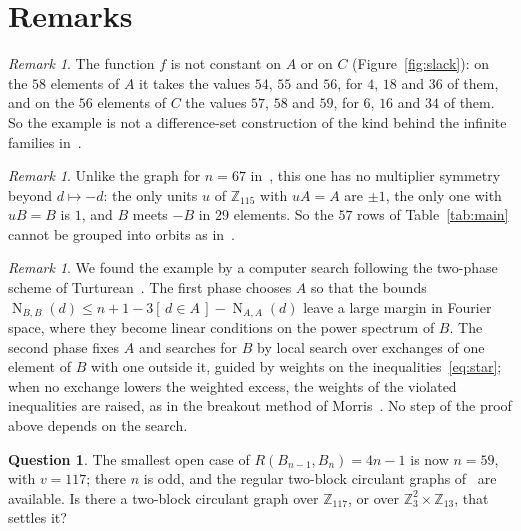 \documentclass[11pt]{amsart}
\theoremstyle{definition}
\newtheorem{question}[theorem]{Question}
\theoremstyle{remark}
\newtheorem{remark}[theorem]{Remark}
\numberwithin{equation}{section}
\newcommand{\Z}{\mathbb{Z}}
\newcommand{\NN}{\operatorname{N}}
\newcommand{\ind}[1]{[\,#1\,]}
\begin{document}
\section{Remarks}\label{sec:remarks}

\begin{remark}
The function $f$ is not constant on $A$ or on $C$ (Figure~\ref{fig:slack}): on the $58$ elements of $A$ it takes the values $54$, $55$ and $56$, for $4$, $18$ and $36$ of them, and on the $56$ elements of $C$ the values $57$, $58$ and $59$, for $6$, $16$ and $34$ of them. So the example is not a difference-set construction of the kind behind the infinite families in~\cite{Sz,Tu,We}.
\end{remark}

\begin{remark}
Unlike the graph for $n=67$ in~\cite{Bh}, this one has no multiplier symmetry beyond $d\mapsto-d$: the only units $u$ of $\Z_{115}$ with $uA=A$ are $\pm1$, the only one with $uB=B$ is $1$, and $B$ meets $-B$ in $29$ elements. So the $57$ rows of Table~\ref{tab:main} cannot be grouped into orbits as in~\cite{Bh}.
\end{remark}

\begin{remark}
We found the example by a computer search following the two-phase scheme of Turturean~\cite{Tu}. The first phase chooses $A$ so that the bounds $\NN_{B,B}(d)\le n+1-3\ind{d\in A}-\NN_{A,A}(d)$ leave a large margin in Fourier space, where they become linear conditions on the power spectrum of $B$. The second phase fixes $A$ and searches for $B$ by local search over exchanges of one element of $B$ with one outside it, guided by weights on the inequalities~\eqref{eq:star}; when no exchange lowers the weighted excess, the weights of the violated inequalities are raised, as in the breakout method of Morris~\cite{Mo}. No step of the proof above depends on the search.
\end{remark}

\begin{question}
The smallest open case of $R(B_{n-1},B_n)=4n-1$ is now $n=59$, with $v=117$; there $n$ is odd, and the regular two-block circulant graphs of~\cite{Bh,We} are available. Is there a two-block circulant graph over $\Z_{117}$, or over $\Z_3^2\times\Z_{13}$, that settles it?
\end{question}
\end{document}
